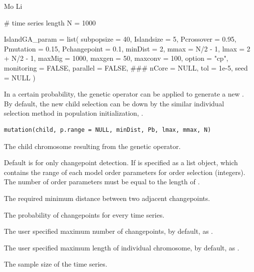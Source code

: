 \documentclass[a4paper]{book}
\begin{document}
%
\begin{Author}
Mo Li
\end{Author}
%
\begin{Examples}
\begin{ExampleCode}
# time series length
N = 1000

IslandGA_param = list(
  subpopsize   = 40,
  Islandsize   = 5,
  Pcrossover   = 0.95,
  Pmutation    = 0.15,
  Pchangepoint = 0.1,
  minDist      = 2,
  mmax         = N/2 - 1,
  lmax         = 2 + N/2 - 1,
  maxMig       = 1000,
  maxgen       = 50,
  maxconv      = 100,
  option       = "cp",
  monitoring   = FALSE,
  parallel     = FALSE, ###
  nCore        = NULL,
  tol          = 1e-5,
  seed         = NULL
)
\end{ExampleCode}
\end{Examples}
%
\begin{Description}
In a certain probability, the  genetic operator can be applied
to generate a new . By default, the new child selection can be
down by the similar individual selection method in population initialization,
.
\end{Description}
%
\begin{Usage}
\begin{verbatim}
mutation(child, p.range = NULL, minDist, Pb, lmax, mmax, N)
\end{verbatim}
\end{Usage}
%
\begin{Arguments}
\begin{ldescription}
\item[\code{child}] The child chromosome resulting from the  genetic
operator.

\item[\code{p.range}] Default is  for only changepoint detection. If
 is specified as a list object, which contains the range of
each model order parameters for order selection (integers). The number of
order parameters must be equal to the length of .

\item[\code{minDist}] The required minimum distance between two adjacent changepoints.

\item[\code{Pb}] The probability of changepoints for every time series.

\item[\code{lmax}] The user specified maximum number of changepoints, by default,
as .

\item[\code{mmax}] The user specified maximum length of individual chromosome,
by default, as .

\item[\code{N}] The sample size of the time series.
\end{ldescription}
\end{Arguments}
\end{document}
